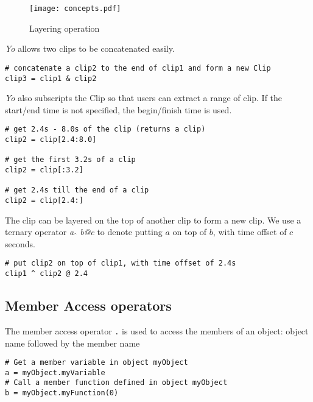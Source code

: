 \documentclass[12pt]{article}
\begin{document}
\begin{figure}[ht]
  \centering
  \texttt{[image: concepts.pdf]}
  \caption{Layering operation}
  \label{fig:layer}
\end{figure}

\label{subsec:clip frame ops}
\textit{Yo} allows two clips to be concatenated easily.
\begin{mdframed}[backgroundcolor=lightgray,hidealllines=true]
\begin{verbatim}
# concatenate a clip2 to the end of clip1 and form a new Clip
clip3 = clip1 & clip2
\end{verbatim}
\end{mdframed}

\textit{Yo} also subscripts the Clip so that users can extract a range of clip. If the start/end time is not specified, the begin/finish time is used.
\begin{mdframed}[backgroundcolor=lightgray,hidealllines=true]
\begin{verbatim}
# get 2.4s - 8.0s of the clip (returns a clip)
clip2 = clip[2.4:8.0]

# get the first 3.2s of a clip
clip2 = clip[:3.2]

# get 2.4s till the end of a clip
clip2 = clip[2.4:]
\end{verbatim}
\end{mdframed}

The clip can be layered on the top of another clip to form a new clip. We use a ternary operator \textit{a $\hat{ }$ b@c} to denote putting $a$ on top of $b$, with time offset of $c$ seconds.
\begin{mdframed}[backgroundcolor=lightgray,hidealllines=true]
\begin{verbatim}
# put clip2 on top of clip1, with time offset of 2.4s
clip1 ^ clip2 @ 2.4
\end{verbatim}
\end{mdframed}

\subsection{Member Access operators} %
The member access operator \texttt{.} is used to access the members of an object: object name followed by the member name
\begin{mdframed}[backgroundcolor=lightgray,hidealllines=true]
\begin{verbatim}
# Get a member variable in object myObject
a = myObject.myVariable      
# Call a member function defined in object myObject
b = myObject.myFunction(0)    
\end{verbatim}
\end{mdframed}
\end{document}
